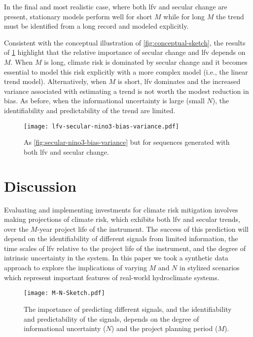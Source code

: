 \documentclass[
  draft,
  linenumbers
]{agujournal2019}
\begin{document}
In the final and most realistic case, where both \gls{lfv} and secular change are present, stationary models perform well for short $M$ while for long $M$ the trend must be identified from a long record and modeled explicitly.

Consistent with the conceptual illustration of \cref{fig:conceptual-sketch}, the results of \cref{fig:lfv-secular-nino3-bias-variance} highlight that the relative importance of secular change and \gls{lfv} depends on $M$.
When $M$ is long, climate risk is dominated by secular change and it becomes essential to model this risk explicitly with a more complex model (i.e.\@\xspace, the linear trend model).
Alternatively, when $M$ is short, \gls{lfv} dominates and the increased variance associated with estimating a trend is not worth the modest reduction in bias.
As before, when the informational uncertainty is large (small $N$), the identifiability and predictability of the trend are  limited.
\begin{figure}
  \centering
  \texttt{[image: lfv-secular-nino3-bias-variance.pdf]}
  \caption{
    As \cref{fig:secular-nino3-bias-variance} but for sequences generated with both \gls{lfv} and secular change.
  }\label{fig:lfv-secular-nino3-bias-variance}
\end{figure}


\clearpage
\section{Discussion}\label{sec:discussion-conclusions}

Evaluating and implementing investments for climate risk mitigation involves making projections of climate risk, which exhibits both \gls{lfv} and secular trends, over the $M$-year project life of the instrument.
The success of this prediction will depend on the identifiability of different signals from limited information, the time scales of \gls{lfv} relative to the project life of the instrument, and the degree of intrinsic uncertainty in the system.
In this paper we took a synthetic data approach to explore the implications of varying $M$ and $N$ in stylized scenarios which represent important features of real-world hydroclimate systems.

\begin{figure}
  \centering
  \texttt{[image: M-N-Sketch.pdf]}
  \caption{
    The importance of predicting different signals, and the identifiability and predictability of the signals, depends on the degree of informational uncertainty ($N$) and the project planning period ($M$).
  }\label{fig:m-n-sketch}
\end{figure}
\end{document}
